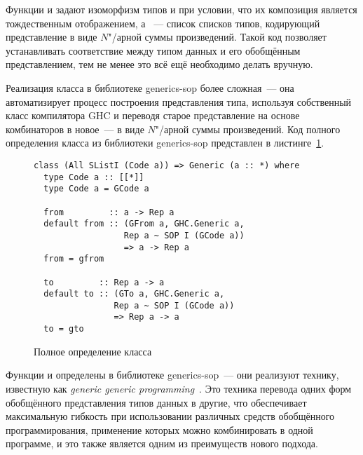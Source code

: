 Функции  и  задают изоморфизм типов  и  при условии, что их композиция является тождественным отображением, а ~--- список списков типов, кодирующий представление в виде $N$"/арной суммы произведений. Такой код позволяет устанавливать соответствие между типом данных и его обобщённым представлением, тем не менее это всё ещё необходимо делать вручную.

Реализация класса  в библиотеке \textsf{generics-sop} более сложная~--- она автоматизирует процесс построения представления типа, используя собственный класс  компилятора \textsf{GHC} и переводя старое представление на основе комбинаторов в новое~--- в виде $N$"/арной суммы произведений. Код полного определения класса  из библиотеки \textsf{generics-sop} представлен в листинге~\ref{list:generics-sop-generic}.
\begin{figure}[h]
\begin{framed}
\vspace{-0.25cm}
\begin{lstlisting}
class (All SListI (Code a)) => Generic (a :: *) where
  type Code a :: [[*]]
  type Code a = GCode a

  from         :: a -> Rep a
  default from :: (GFrom a, GHC.Generic a,
                  Rep a ~ SOP I (GCode a))
                  => a -> Rep a
  from = gfrom

  to         :: Rep a -> a
  default to :: (GTo a, GHC.Generic a,
                Rep a ~ SOP I (GCode a))
                => Rep a -> a
  to = gto
\end{lstlisting}
\vspace{-0.25cm}
\end{framed}
\caption{Полное определение класса }
\label{list:generics-sop-generic}
\end{figure}

Функции  и  определены в библиотеке \textsf{generics-sop}~--- они реализуют технику, известную как \textsl{generic generic programming}~\cite{GGP2014}. Это техника перевода одних форм обобщённого представления типов данных в другие, что обеспечивает максимальную гибкость при использовании различных средств обобщённого программирования, применение которых можно комбинировать в одной программе, и это также является одним из преимуществ нового подхода.

